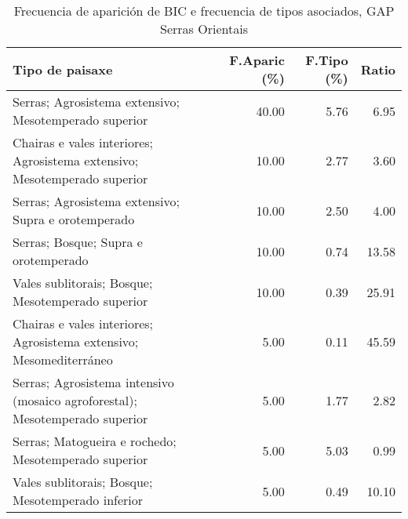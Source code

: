 \begin{table}[p]
\centering
\caption{Frecuencia de aparición de BIC e frecuencia de tipos asociados, GAP Serras Orientais} 
\label{vbic5}
\begin{tabular}{lrrr}
  \hline
Tipo de paisaxe & F.Aparic (\%) & F.Tipo (\%) & Ratio \\ 
  \hline
Serras; Agrosistema extensivo; Mesotemperado superior & 40.00 & 5.76 & 6.95 \\ 
  Chairas e vales interiores; Agrosistema extensivo; Mesotemperado superior & 10.00 & 2.77 & 3.60 \\ 
  Serras; Agrosistema extensivo; Supra e orotemperado & 10.00 & 2.50 & 4.00 \\ 
  Serras; Bosque; Supra e orotemperado & 10.00 & 0.74 & 13.58 \\ 
  Vales sublitorais; Bosque; Mesotemperado superior & 10.00 & 0.39 & 25.91 \\ 
  Chairas e vales interiores; Agrosistema extensivo; Mesomediterráneo & 5.00 & 0.11 & 45.59 \\ 
  Serras; Agrosistema intensivo (mosaico agroforestal); Mesotemperado superior & 5.00 & 1.77 & 2.82 \\ 
  Serras; Matogueira e rochedo; Mesotemperado superior & 5.00 & 5.03 & 0.99 \\ 
  Vales sublitorais; Bosque; Mesotemperado inferior & 5.00 & 0.49 & 10.10 \\ 
   \hline
\end{tabular}
\end{table}
